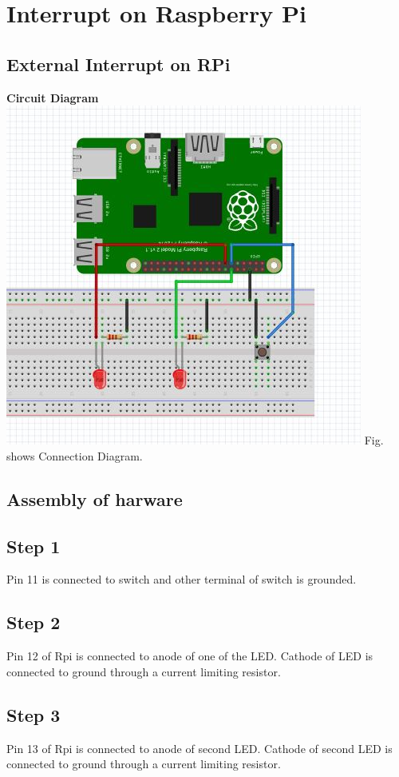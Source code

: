\documentclass[a4paper,12pt,oneside]{book}
\begin{document}
\section{Interrupt on Raspberry Pi}
\subsection*{External Interrupt on RPi}

\textbf{Circuit Diagram}  \\
\centering
\includegraphics[scale = 0.6]{switch_interrupt}
\flushleft
Fig. shows Connection Diagram.
\subsection*{Assembly of harware}
\subsection*{Step 1}
Pin 11 is connected to switch and other terminal of switch is grounded.
\subsection*{Step 2}
Pin 12 of Rpi is connected to anode of one of the LED. Cathode of LED is connected to ground through a current limiting resistor.
\subsection*{Step 3}
Pin 13 of Rpi is connected to anode of second LED. Cathode of second LED is connected to ground through a current limiting resistor.
\end{document}
